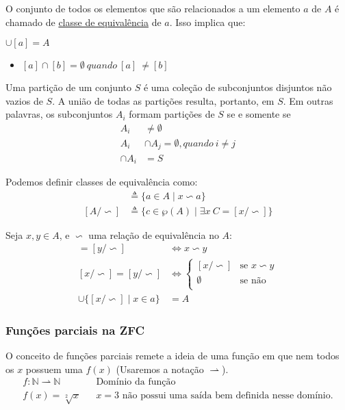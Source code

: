 \documentclass[12pt, a4paper]{article}
\begin{document}
O conjunto de todos os elementos que são relacionados a um elemento $a$ de $A$ é chamado de \underline{classe de equivalência} de $a$. Isso implica que:
\begin{center}
$\cup [a] = A$
\end{center}

\begin{itemize}
\item $[a] \cap [b] = \emptyset ~quando~ [a]~ \neq[b]$\\
\end{itemize}

Uma partição de um conjunto $S$ é uma coleção de subconjuntos disjuntos não vazios de $S$. A união de todas as partições resulta, portanto, em $S$. Em outras palavras, os subconjuntos $A_i$ formam partições de $S$ se e somente se\\
\begin{align*}
A_i &\neq \emptyset\\
A_i &\cap A_j = \emptyset, quando~i \neq j\\
\cap A_i &= S
\end{align*}

Podemos definir classes de equivalência como:\\
\begin{align*}
[x/\backsim] &\triangleq \{a \in A \mid x \backsim a \}\\
[A/\backsim] &\triangleq \{c \in \wp(A) \mid \exists x ~ C = [x/\backsim] \}
\end{align*}

Seja $x,y \in A$, e $\backsim$ uma relação de equivalência no $A$:
\begin{align*}
[x/\backsim] = [y/\backsim] &\iff x \backsim y\\
[x/\backsim] = [y/\backsim] &\iff
\begin{cases}
[x/\backsim] 	& \text{se } x \backsim y \\
\emptyset 		& \text{se não}\\
\end{cases}
\\
\cup\{[x/ \backsim] \mid x \in a \} &= A
\end{align*}

\subsubsection{Funções parciais na ZFC}
O conceito de funções parciais remete a ideia de uma função em que nem todos os $x$ possuem uma $f(x)$ (Usaremos a notação $\rightharpoonup$).
\begin{align*}
f: \mathbb{N} \rightharpoonup  \mathbb{N} && \text{Domínio da função}\\
f(x) = \sqrt[2]{x} && x = 3 \text{ não possui uma saída bem definida nesse domínio.}
\end{align*}
\end{document}
